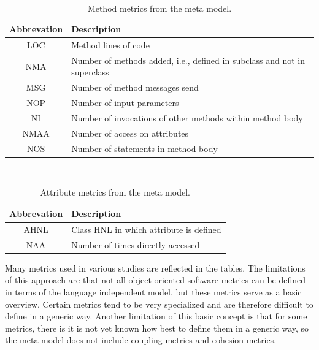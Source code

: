 \begin{table}
	\caption{Method metrics from the meta model.}~\label{tab:methodmetrics}
	
	\setlength\tabcolsep{3pt}
	\renewcommand{\arraystretch}{1.4}%
	\begin{tabularx}{\columnwidth}{ | c | p{7cm} | }
		\hline
		Abbrevation & Description \\ \hline\hline
		LOC & Method lines of code \\ \hline
		NMA & Number of methods added, i.e., defined in subclass and not in superclass \\ \hline
		MSG & Number of method messages send \\ \hline
		NOP & Number of input parameters \\ \hline
		NI & Number of invocations of other methods within method body \\ \hline
		NMAA & Number of access on attributes \\ \hline
		NOS & Number of statements in method body \\ \hline
	\end{tabularx}
\end{table}

\begin{table}
	\caption{Attribute metrics from the meta model.}~\label{tab:attributesmetrics}
	
	\setlength\tabcolsep{3pt}
	\renewcommand{\arraystretch}{1.4}%
	\begin{tabularx}{\columnwidth}{ | c | p{7cm} | }
		\hline
		Abbrevation & Description \\ \hline\hline
		AHNL & Class HNL in which attribute is defined \\ \hline
		NAA & Number of times directly accessed \\ \hline
	\end{tabularx}
\end{table}

Many metrics used in various studies are reflected in the tables.
The limitations of this approach are that not all object-oriented software metrics can be defined in terms of the language independent model, but these metrics serve as a basic overview. Certain metrics tend to be very specialized and are therefore difficult to define in a generic way. Another limitation of this basic concept is that for some metrics, there is it is not yet known how best to define them in a generic way, so the meta model does not include coupling metrics and cohesion metrics.

